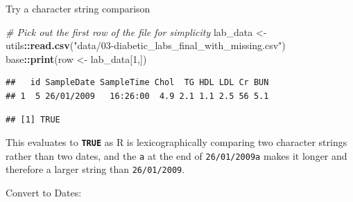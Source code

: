 \documentclass[
]{book}
\newenvironment{Shaded}{\begin{snugshade}}{\end{snugshade}}
\newcommand{\AttributeTok}[1]{\textcolor[rgb]{0.13,0.29,0.53}{#1}}
\newcommand{\CommentTok}[1]{\textcolor[rgb]{0.56,0.35,0.01}{\textit{#1}}}
\newcommand{\ConstantTok}[1]{\textcolor[rgb]{0.56,0.35,0.01}{#1}}
\newcommand{\DataTypeTok}[1]{\textcolor[rgb]{0.13,0.29,0.53}{#1}}
\newcommand{\DecValTok}[1]{\textcolor[rgb]{0.00,0.00,0.81}{#1}}
\newcommand{\FunctionTok}[1]{\textcolor[rgb]{0.13,0.29,0.53}{\textbf{#1}}}
\newcommand{\NormalTok}[1]{#1}
\newcommand{\OtherTok}[1]{\textcolor[rgb]{0.56,0.35,0.01}{#1}}
\newcommand{\SpecialCharTok}[1]{\textcolor[rgb]{0.81,0.36,0.00}{\textbf{#1}}}
\newcommand{\StringTok}[1]{\textcolor[rgb]{0.31,0.60,0.02}{#1}}
\begin{document}
Try a character string comparison

\begin{Shaded}
\begin{Highlighting}[]
\CommentTok{\# Pick out the first row of the file for simplicity}
\NormalTok{lab\_data }\OtherTok{\textless{}{-}}\NormalTok{ utils}\SpecialCharTok{::}\FunctionTok{read.csv}\NormalTok{(}\StringTok{"data/03{-}diabetic\_labs\_final\_with\_missing.csv"}\NormalTok{)}
\NormalTok{base}\SpecialCharTok{::}\FunctionTok{print}\NormalTok{(row }\OtherTok{\textless{}{-}}\NormalTok{ lab\_data[}\DecValTok{1}\NormalTok{,])}
\end{Highlighting}
\end{Shaded}

\begin{verbatim}
##   id SampleDate SampleTime Chol  TG HDL LDL Cr BUN
## 1  5 26/01/2009   16:26:00  4.9 2.1 1.1 2.5 56 5.1
\end{verbatim}

\begin{Shaded}
\end{Shaded}

\begin{verbatim}
## [1] TRUE
\end{verbatim}

This evaluates to \textbf{\texttt{TRUE}} as R is lexicographically comparing two character strings rather than two dates, and the \texttt{a} at the end of \texttt{26/01/2009a} makes it longer and therefore a larger string than \texttt{26/01/2009}.

Convert to Dates:

\begin{Shaded}
\end{Shaded}
\end{document}
